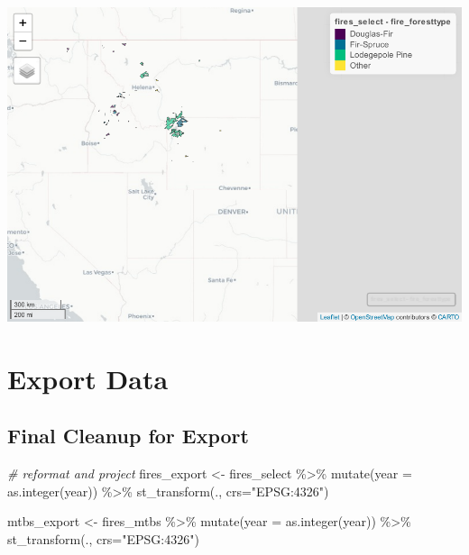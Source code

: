 \documentclass[
]{book}
\newenvironment{Shaded}{\begin{snugshade}}{\end{snugshade}}
\newcommand{\AttributeTok}[1]{\textcolor[rgb]{0.77,0.63,0.00}{#1}}
\newcommand{\CommentTok}[1]{\textcolor[rgb]{0.56,0.35,0.01}{\textit{#1}}}
\newcommand{\FunctionTok}[1]{\textcolor[rgb]{0.00,0.00,0.00}{#1}}
\newcommand{\NormalTok}[1]{#1}
\newcommand{\OtherTok}[1]{\textcolor[rgb]{0.56,0.35,0.01}{#1}}
\newcommand{\SpecialCharTok}[1]{\textcolor[rgb]{0.00,0.00,0.00}{#1}}
\newcommand{\StringTok}[1]{\textcolor[rgb]{0.31,0.60,0.02}{#1}}
\begin{document}
\includegraphics{_main_files/figure-latex/plot forest type-1.pdf}

\hypertarget{export-data}{%
\section{Export Data}\label{export-data}}

\hypertarget{final-cleanup-for-export}{%
\subsection{Final Cleanup for Export}\label{final-cleanup-for-export}}

\begin{Shaded}
\begin{Highlighting}[]
\CommentTok{\# reformat and project}
\NormalTok{fires\_export }\OtherTok{\textless{}{-}}\NormalTok{ fires\_select }\SpecialCharTok{\%\textgreater{}\%} 
  \FunctionTok{mutate}\NormalTok{(}\AttributeTok{year =} \FunctionTok{as.integer}\NormalTok{(year)) }\SpecialCharTok{\%\textgreater{}\%} 
  \FunctionTok{st\_transform}\NormalTok{(., }\AttributeTok{crs=}\StringTok{"EPSG:4326"}\NormalTok{)}

\NormalTok{mtbs\_export }\OtherTok{\textless{}{-}}\NormalTok{ fires\_mtbs }\SpecialCharTok{\%\textgreater{}\%} 
  \FunctionTok{mutate}\NormalTok{(}\AttributeTok{year =} \FunctionTok{as.integer}\NormalTok{(year)) }\SpecialCharTok{\%\textgreater{}\%} 
  \FunctionTok{st\_transform}\NormalTok{(., }\AttributeTok{crs=}\StringTok{"EPSG:4326"}\NormalTok{)}
\end{Highlighting}
\end{Shaded}
\end{document}
